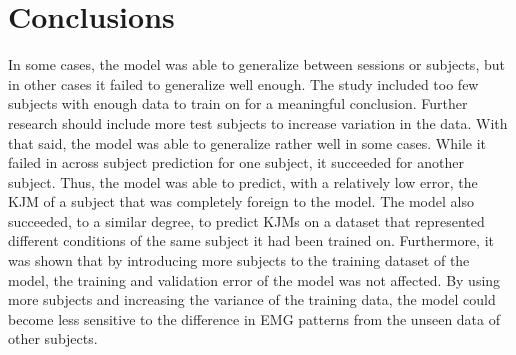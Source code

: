 \documentclass[../main.tex]{subfiles}
\begin{document}
\chapter{Conclusions}
In some cases, the model was able to generalize between sessions or subjects, but in other cases it failed to generalize well enough.
The study included too few subjects with enough data to train on for a meaningful conclusion.
Further research should include more test subjects to increase variation in the data.
With that said, the model was able to generalize rather well in some cases.
While it failed in across subject prediction for one subject, it succeeded for another subject.
Thus, the model was able to predict, with a relatively low error, the \ac{KJM} of a subject that was completely foreign to the model.
The model also succeeded, to a similar degree, to predict \acp{KJM} on a dataset that represented different conditions of the same subject it had been trained on.
Furthermore, it was shown that by introducing more subjects to the training dataset of the model, the training and validation error of the model was not affected.
By using more subjects and increasing the variance of the training data, the model could become less sensitive to the difference in \ac{EMG} patterns from the unseen data of other subjects.
\end{document}

